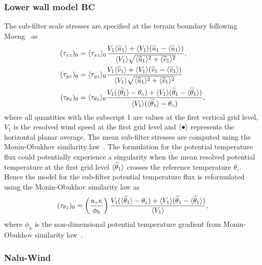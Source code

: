 \subsubsection{\label{sec:wallmodelBC}Lower wall model BC}
The sub-filter scale stresses are specified at the terrain boundary following
Moeng~\cite{Moeng1984} as
\begin{align}
 (\tau_{xz})_0 &= \langle \tau_{xz} \rangle_0 \frac{V_1 \langle \widetilde{u}_1 \rangle + \langle V_1 \rangle (\widetilde{u}_1 - \langle \widetilde{u}_1 \rangle ) }{ \langle V_1 \rangle \sqrt{\langle \widetilde{u}_1 \rangle^2 + \langle \widetilde{v}_1 \rangle^2 } } , \\
 (\tau_{yz})_0 &= \langle \tau_{yz} \rangle_0 \frac{V_1 \langle \widetilde{v}_1 \rangle + \langle V_1 \rangle (\widetilde{v}_1 - \langle \widetilde{v}_1 \rangle ) }{ \langle V_1 \rangle \sqrt{\langle \widetilde{u}_1 \rangle^2 + \langle \widetilde{v}_1 \rangle^2 } } \\
  (\tau_{\theta z})_0 &= \langle \tau_{\theta z} \rangle_0 \frac{V_1 ( \langle \widetilde{\theta}_1 \rangle - \theta_{\circ} ) + \langle V_1 \rangle (\widetilde{\theta}_1 - \langle \widetilde{\theta}_1 \rangle ) }{ \langle V_1 \rangle ( \langle \widetilde{\theta}_1 \rangle - \theta_{\circ} ) },
\end{align}
where all quantities with the subscript 1 are values at the first vertical grid
level, $V_1$ is the resolved wind speed at the first grid level and
$\langle \bullet \rangle$ represents the horizontal planar average. The mean
sub-filter stresses are computed using the Monin-Obukhov similarity
law~\cite{Etling1996}. The formulation for the potential temperature flux could
potentially experience a singularity when the mean resolved potential
temperature at the first grid level $\langle \widetilde{\theta}_1 \rangle$ crosses the
reference temperature $\theta_{\circ}$. Hence the model for the sub-filter
potential temperature flux is reformulated using the Monin-Obukhov similarity
law as
\begin{equation}
(\tau_{\theta z})_0 = \left ( \frac{u_{\tau} \kappa}{ \phi_h} \right ) \frac{V_1 ( \langle \widetilde{\theta}_1 \rangle - \theta_{\circ} ) + \langle V_1 \rangle (\widetilde{\theta}_1 - \langle \widetilde{\theta}_1 \rangle ) }{ \langle V_1 \rangle },
\end{equation}
where $\phi_h$ is the non-dimensional potential temperature gradient from
Monin-Obukhov similarity law~\cite{Etling1996}.


\subsubsection{Nalu-Wind}

